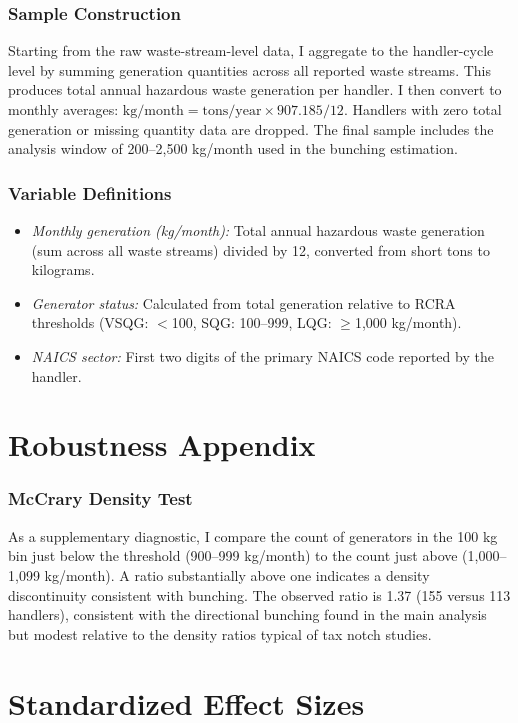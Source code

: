 \documentclass[12pt]{article}
\begin{document}
\subsubsection*{Sample Construction}
Starting from the raw waste-stream-level data, I aggregate to the handler-cycle level by summing generation quantities across all reported waste streams. This produces total annual hazardous waste generation per handler. I then convert to monthly averages: $\text{kg/month} = \text{tons/year} \times 907.185 / 12$. Handlers with zero total generation or missing quantity data are dropped. The final sample includes the analysis window of 200--2,500 kg/month used in the bunching estimation.

\subsubsection*{Variable Definitions}
\begin{itemize}
\item \textit{Monthly generation (kg/month):} Total annual hazardous waste generation (sum across all waste streams) divided by 12, converted from short tons to kilograms.
\item \textit{Generator status:} Calculated from total generation relative to RCRA thresholds (VSQG: $<$100, SQG: 100--999, LQG: $\geq$1,000 kg/month).
\item \textit{NAICS sector:} First two digits of the primary NAICS code reported by the handler.
\end{itemize}


\section{Robustness Appendix}

\subsubsection*{McCrary Density Test}
As a supplementary diagnostic, I compare the count of generators in the 100 kg bin just below the threshold (900--999 kg/month) to the count just above (1,000--1,099 kg/month). A ratio substantially above one indicates a density discontinuity consistent with bunching. The observed ratio is 1.37 (155 versus 113 handlers), consistent with the directional bunching found in the main analysis but modest relative to the density ratios typical of tax notch studies.


\section{Standardized Effect Sizes}
\label{sec:sde}


\end{document}

